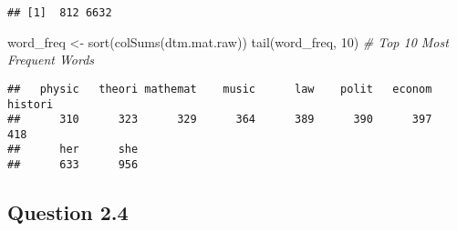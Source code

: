 \documentclass[
]{article}
\newenvironment{Shaded}{\begin{snugshade}}{\end{snugshade}}
\newcommand{\CommentTok}[1]{\textcolor[rgb]{0.56,0.35,0.01}{\textit{#1}}}
\newcommand{\DecValTok}[1]{\textcolor[rgb]{0.00,0.00,0.81}{#1}}
\newcommand{\FunctionTok}[1]{\textcolor[rgb]{0.00,0.00,0.00}{#1}}
\newcommand{\NormalTok}[1]{#1}
\newcommand{\OtherTok}[1]{\textcolor[rgb]{0.56,0.35,0.01}{#1}}
\newcommand{\SpecialCharTok}[1]{\textcolor[rgb]{0.00,0.00,0.00}{#1}}
\newcommand{\StringTok}[1]{\textcolor[rgb]{0.31,0.60,0.02}{#1}}
\begin{document}
\begin{verbatim}
## [1]  812 6632
\end{verbatim}

\begin{Shaded}
\begin{Highlighting}[]
\NormalTok{word\_freq }\OtherTok{\textless{}{-}} \FunctionTok{sort}\NormalTok{(}\FunctionTok{colSums}\NormalTok{(dtm.mat.raw))}
\FunctionTok{tail}\NormalTok{(word\_freq, }\DecValTok{10}\NormalTok{) }\CommentTok{\# Top 10 Most Frequent Words}
\end{Highlighting}
\end{Shaded}

\begin{verbatim}
##   physic   theori mathemat    music      law    polit   econom  histori 
##      310      323      329      364      389      390      397      418 
##      her      she 
##      633      956
\end{verbatim}

\hypertarget{question-2.4}{%
\subsection{Question 2.4}\label{question-2.4}}

\begin{Shaded}
\end{Shaded}
\end{document}
